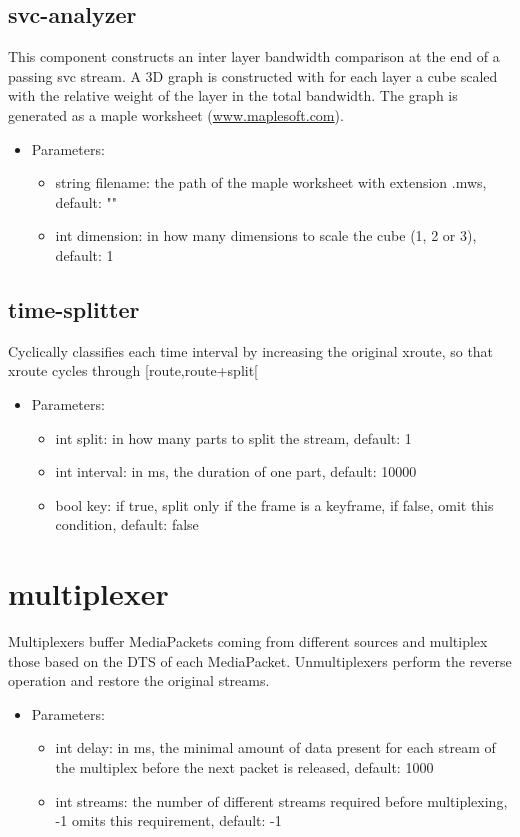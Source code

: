 \subsection{svc-analyzer}
This component constructs an inter layer bandwidth comparison at the end of a passing svc stream. A 3D graph is constructed with for each layer a cube scaled with the relative weight of the layer in the total bandwidth. The graph is generated as a maple worksheet (\url{www.maplesoft.com}).
\begin{itemize}
\item Parameters:
\begin{itemize}
\item string filename: the path of the maple worksheet with extension .mws, default: ""
\item int dimension: in how many dimensions to scale the cube (1, 2 or 3), default: 1
\end{itemize}
\end{itemize}
\subsection{time-splitter}
Cyclically classifies each time interval by increasing the original xroute, so that xroute cycles through [route,route+split[
\begin{itemize}
\item Parameters:
\begin{itemize}
\item int split: in how many parts to split the stream, default: 1
\item int interval: in ms, the duration of one part, default: 10000
\item bool key: if true, split only if the frame is a keyframe, if false, omit this condition, default: false
\end{itemize}
\end{itemize}
\newpage
\section{multiplexer}
Multiplexers buffer MediaPackets coming from different sources and multiplex those based on the DTS of each MediaPacket. Unmultiplexers perform the reverse operation and restore the original streams.
\begin{itemize}
\item Parameters:
\begin{itemize}
\item int delay: in ms, the minimal amount of data present for each stream of the multiplex before the next packet is released, default: 1000
\item int streams: the number of different streams required before multiplexing, -1 omits this requirement, default: -1
\end{itemize}
\end{itemize}
